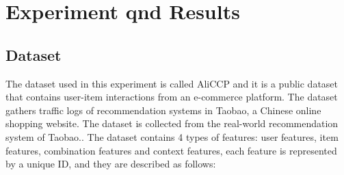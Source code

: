 \chapter{Experiment qnd Results}
\minitoc

\section{Dataset}

The dataset used in this experiment is called AliCCP and it is a public dataset that contains user-item interactions from an e-commerce platform. The dataset gathers traffic logs of recommendation systems in Taobao, a Chinese online shopping website. The dataset is collected from the real-world recommendation system of Taobao.\cite{AliCPP}. The dataset contains 4 types of features: user features, item features, combination features and context features, each feature is represented by a unique ID, and they are described as follows:


